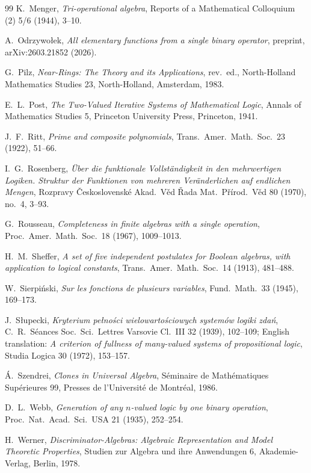 \documentclass[11pt]{article}
\theoremstyle{definition}
\theoremstyle{remark}
\begin{document}
\begin{thebibliography}{99}
 K.~Menger, \emph{Tri-operational algebra}, Reports
of a Mathematical Colloquium (2) 5/6 (1944), 3--10.

 A.~Odrzywo{\l}ek, \emph{All elementary
functions from a single binary operator}, preprint, arXiv:2603.21852
(2026).

 G.~Pilz, \emph{Near-Rings: The Theory and its
Applications}, rev.\ ed., North-Holland Mathematics Studies 23,
North-Holland, Amsterdam, 1983.

 E.~L.~Post, \emph{The Two-Valued Iterative Systems of
Mathematical Logic}, Annals of Mathematics Studies 5, Princeton
University Press, Princeton, 1941.

 J.~F.~Ritt, \emph{Prime and composite polynomials},
Trans.\ Amer.\ Math.\ Soc.\ 23 (1922), 51--66.

 I.~G.~Rosenberg, \emph{\"Uber die funktionale
Vollst\"andigkeit in den mehrwertigen Logiken.  Struktur der
Funktionen von mehreren Ver\"anderlichen auf endlichen Mengen},
Rozpravy \v{C}eskoslovensk\'e Akad.\ V\v{e}d \v{R}ada Mat.\
P\v{r}\'irod.\ V\v{e}d 80 (1970), no.~4, 3--93.

 G.~Rousseau, \emph{Completeness in finite algebras
with a single operation}, Proc.\ Amer.\ Math.\ Soc.\ 18 (1967),
1009--1013.

 H.~M.~Sheffer, \emph{A set of five independent
postulates for Boolean algebras, with application to logical
constants}, Trans.\ Amer.\ Math.\ Soc.\ 14 (1913), 481--488.

 W.~Sierpi\'nski, \emph{Sur les fonctions de
plusieurs variables}, Fund.\ Math.\ 33 (1945), 169--173.

 J.~S{\l}upecki, \emph{Kryterium pe{\l}no\'sci
wielowarto\'sciowych system\'ow logiki zda\'n}, C.~R.\ S\'eances
Soc.\ Sci.\ Lettres Varsovie Cl.~III 32 (1939), 102--109; English
translation: \emph{A criterion of fullness of many-valued systems of
propositional logic}, Studia Logica 30 (1972), 153--157.

 \'A.~Szendrei, \emph{Clones in Universal Algebra},
S\'eminaire de Math\'ematiques Sup\'erieures 99, Presses de
l'Universit\'e de Montr\'eal, 1986.

 D.~L.~Webb, \emph{Generation of any $n$-valued logic
by one binary operation}, Proc.\ Nat.\ Acad.\ Sci.\ USA 21 (1935),
252--254.

 H.~Werner, \emph{Discriminator-Algebras: Algebraic
Representation and Model Theoretic Properties}, Studien zur Algebra
und ihre Anwendungen 6, Akademie-Verlag, Berlin, 1978.

\end{thebibliography}
\end{document}
